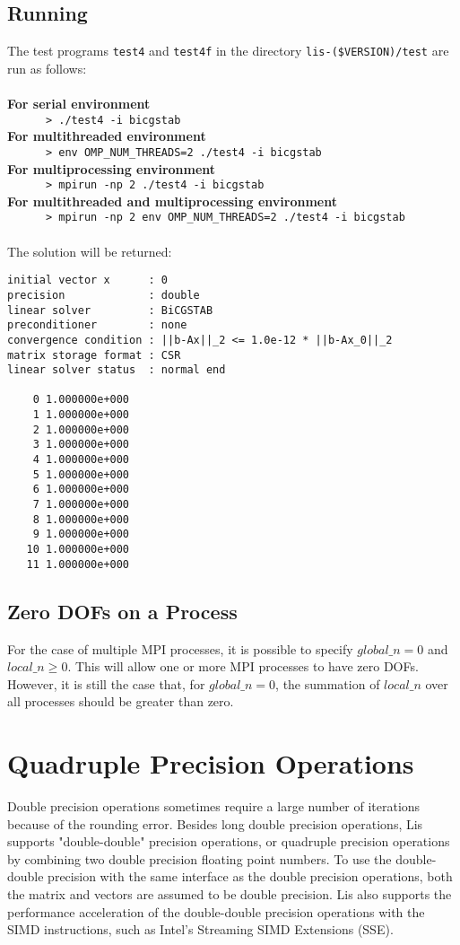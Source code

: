 \documentclass[a4paper]{article}
\begin{document}
\subsection{Running}
The test programs \verb|test4| and \verb|test4f| 
in the directory \verb|lis-($VERSION)/test| are run as follows: \\\\
{\bf For serial environment}\\
\verb+      > ./test4 -i bicgstab+\\
{\bf For multithreaded environment}\\
\verb+      > env OMP_NUM_THREADS=2 ./test4 -i bicgstab +\\
{\bf For multiprocessing environment}\\
\verb+      > mpirun -np 2 ./test4 -i bicgstab +\\
{\bf For multithreaded and multiprocessing environment}\\
\verb+      > mpirun -np 2 env OMP_NUM_THREADS=2 ./test4 -i bicgstab +\\\\
The solution will be returned:

\begin{verbatim}
initial vector x      : 0
precision             : double
linear solver         : BiCGSTAB
preconditioner        : none
convergence condition : ||b-Ax||_2 <= 1.0e-12 * ||b-Ax_0||_2
matrix storage format : CSR
linear solver status  : normal end

    0 1.000000e+000
    1 1.000000e+000
    2 1.000000e+000
    3 1.000000e+000
    4 1.000000e+000
    5 1.000000e+000
    6 1.000000e+000
    7 1.000000e+000
    8 1.000000e+000
    9 1.000000e+000
   10 1.000000e+000
   11 1.000000e+000
\end{verbatim}

\subsection{Zero DOFs on a Process}
For the case of multiple MPI processes, it is possible to specify
$global\_n = 0$ and $local\_n \ge 0$. This will allow one or more
MPI processes to have zero DOFs. However, it is still the case that,
for $global\_n = 0$, the summation of $local\_n$ over all processes
should be greater than zero. 

\newpage
\section{Quadruple Precision Operations}
\label{sec:quadruple}
\indent
Double precision operations sometimes require a large number of iterations 
because of the rounding error. Besides long double precision operations,
Lis supports "double-double" precision operations, 
or quadruple precision operations by combining 
two double precision floating point numbers\cite{dd,qd}.
To use the double-double precision with the same interface 
as the double precision operations, 
both the matrix and vectors are assumed to be double precision. 
Lis also supports the performance acceleration of the double-double precision
operations with the SIMD instructions, such as
Intel's Streaming SIMD Extensions (SSE)\cite{quadlis}. 
\end{document}
